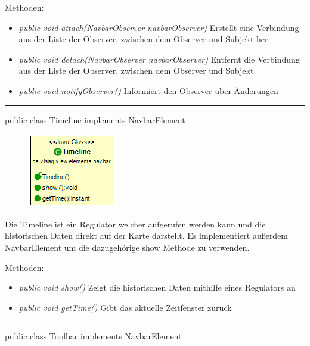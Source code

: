 Methoden:
\begin{itemize} 
    \item \emph{public void attach(NavbarObserver navbarObserver)} Erstellt eine Verbindung aus der Liste der Observer, zwischen dem Observer und Subjekt her
    \item \emph{public void detach(NavbarObserver navbarObserver)} Entfernt die Verbindung aus der Liste der Observer, zwischen dem Observer und Subjekt
    \item \emph{public void notifyObserver()} Informiert den Observer über Änderungen
\end{itemize}


\rule{\textwidth}{0.4pt} 
public class Timeline implements NavbarElement

\begin{minipage}{0.3\textwidth}
    \begin{figure}[H]
        \includegraphics[scale = 0.7]{media/frontend/view/de.view.elements.navbar/TimelineClass.png}
    \end{figure}
    \end{minipage} \hfill
\begin{minipage}{0.6\textwidth}
Die Timeline ist ein Regulator welcher aufgerufen werden kann und die historischen Daten direkt auf der Karte darstellt. Es implementiert außerdem NavbarElement um die dazugehörige show Methode zu verwenden.
\end{minipage}

Methoden:
\begin{itemize} 
    \item \emph{public void show()} Zeigt die historischen Daten mithilfe eines Regulators an 
    \item \emph{public void getTime()} Gibt das aktuelle Zeitfenster zurück
\end{itemize}

\rule{\textwidth}{0.4pt} 
public class Toolbar implements NavbarElement

